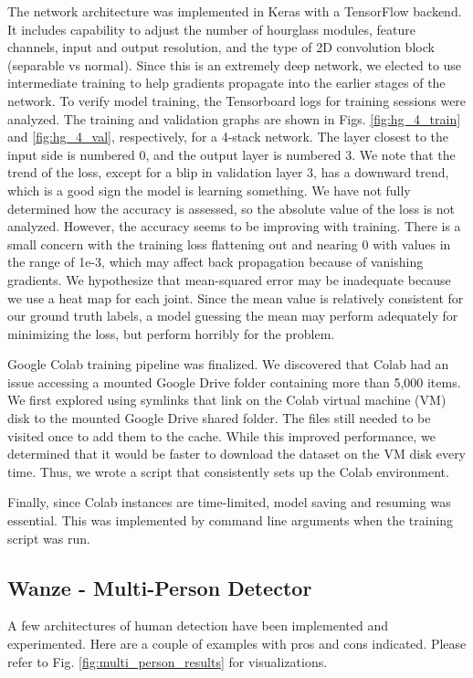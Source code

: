 \documentclass[11pt, letterpaper]{article}
\begin{document}
The network architecture was implemented in Keras with a TensorFlow backend. It includes capability to adjust the number of hourglass modules, feature channels, input and output resolution, and the type of 2D convolution block (separable vs normal). Since this is an extremely deep network, we elected to use intermediate training to help gradients propagate into the earlier stages of the network. To verify model training, the Tensorboard logs for training sessions were analyzed. The training and validation graphs are shown in Figs. \ref{fig:hg_4_train} and \ref{fig:hg_4_val}, respectively, for a 4-stack network. The layer closest to the input side is numbered 0, and the output layer is numbered 3. We note that the trend of the loss, except for a blip in validation layer 3, has a downward trend, which is a good sign the model is learning something. We have not fully determined how the accuracy is assessed, so the absolute value of the loss is not analyzed. However, the accuracy seems to be improving with training. There is a small concern with the training loss flattening out and nearing 0 with values in the range of 1e-3, which may affect back propagation because of vanishing gradients. We hypothesize that mean-squared error may be inadequate because we use a heat map for each joint. Since the mean value is relatively consistent for our ground truth labels, a model guessing the mean may perform adequately for minimizing the loss, but perform horribly for the problem.

Google Colab training pipeline was finalized. We discovered that Colab had an issue accessing a mounted Google Drive folder containing more than 5,000 items. We first explored using symlinks that link on the Colab virtual machine (VM) disk to the mounted Google Drive shared folder. The files still needed to be visited once to add them to the cache. While this improved performance, we determined that it would be faster to download the dataset on the VM disk every time. Thus, we wrote a script that consistently sets up the Colab environment.

Finally, since Colab instances are time-limited, model saving and resuming was essential. This was implemented by command line arguments when the training script was run.


\subsection{Wanze - Multi-Person Detector}
A few architectures of human detection have been implemented and experimented. Here are a couple of examples with pros and cons indicated. Please refer to Fig. \ref{fig:multi_person_results} for visualizations.
\end{document}
